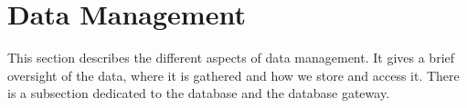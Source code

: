 \section{Data Management}
\label{sec:datamanage}

This section describes the different aspects of data management. It gives a brief oversight of the data, where it is gathered and how we store and access it. There is a subsection dedicated to the database and the database gateway.


